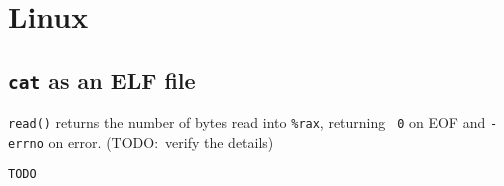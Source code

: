 \section{Linux}
\subsection{{\tt cat} as an ELF file}
{\tt read()} returns the number of bytes read into \verb|%rax|, returning {\tt
0} on EOF and {\tt -errno} on error. (TODO:~verify the details)

\begin{verbatim}
TODO
\end{verbatim}
